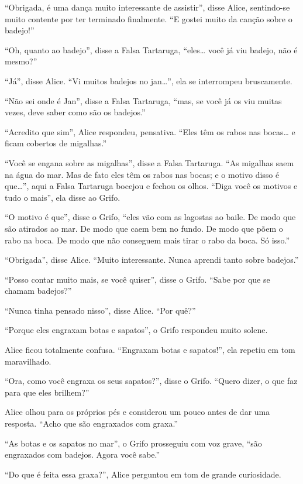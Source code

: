 ``Obrigada, é uma dança muito interessante de assistir'', disse Alice,
sentindo-se muito contente por ter terminado finalmente. ``E gostei
muito da canção sobre o badejo!''

``Oh, quanto ao badejo'', disse a Falsa Tartaruga, ``eles\ldots{} você já viu
badejo, não é mesmo?''

``Já'', disse Alice. ``Vi muitos badejos no jan\ldots{}'', ela se interrompeu
bruscamente.

``Não sei onde é Jan'', disse a Falsa Tartaruga, ``mas, se você já os viu
muitas vezes, deve saber como são os badejos.''

``Acredito que sim'', Alice respondeu, pensativa. ``Eles têm os rabos nas
bocas\ldots{} e ficam cobertos de migalhas.''

``Você se engana sobre as migalhas'', disse a Falsa Tartaruga. ``As
migalhas saem na água do mar. Mas de fato eles têm os rabos nas bocas; e
o motivo disso é que\ldots{}'', aqui a Falsa Tartaruga bocejou e fechou os
olhos. ``Diga você os motivos e tudo o mais'', ela disse ao Grifo.

``O motivo é que'', disse o Grifo, ``eles vão com as lagostas ao baile.
De modo que são atirados ao mar. De modo que caem bem no fundo. De modo
que põem o rabo na boca. De modo que não conseguem mais tirar o rabo da
boca. Só isso.''

``Obrigada'', disse Alice. ``Muito interessante. Nunca aprendi tanto
sobre badejos.''

``Posso contar muito mais, se você quiser'', disse o Grifo. ``Sabe por
que se chamam badejos?''

``Nunca tinha pensado nisso'', disse Alice. ``Por quê?''

``Porque eles engraxam botas e sapatos'', o Grifo respondeu muito solene.

Alice ficou totalmente confusa. ``Engraxam botas e sapatos!'', ela
repetiu em tom maravilhado.

``Ora, como você engraxa os seus sapatos?'', disse o Grifo. ``Quero
dizer, o que faz para que eles brilhem?''

Alice olhou para os próprios pés e considerou um pouco antes de dar uma
resposta. ``Acho que são engraxados com graxa.''

``As botas e os sapatos no mar'', o Grifo prosseguiu com voz grave,
``são engraxados com badejos. Agora você sabe.''

``Do que é feita essa graxa?'', Alice perguntou em tom de grande
curiosidade.

